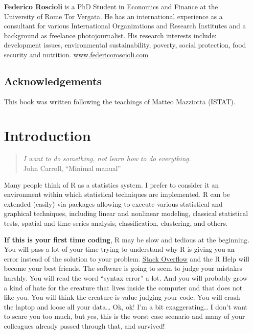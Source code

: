 \documentclass[
]{svmono}
\begin{document}
\textbf{Federico Roscioli} is a PhD Student in Economics and Finance at the University of Rome Tor Vergata. He has an international experience as a consultant for various International Organizations and Research Institutes and a background as freelance photojournalist. His research interests include: development issues, environmental sustainability, poverty, social protection, food security and nutrition.
\href{https://www.federicoroscioli.com/}{www.federicoroscioli.com}

\hypertarget{acknowledgements}{%
\section*{Acknowledgements}\label{acknowledgements}}

This book was written following the teachings of Matteo Mazziotta (ISTAT).

\newpage

\hypertarget{introduction}{%
\chapter*{Introduction}\label{introduction}}

\justifying

\begin{quote}
\emph{I want to do something, not learn how to do everything.}\\
John Carroll, ``Minimal manual''
\end{quote}

Many people think of R as a statistics system. I prefer to consider it
an environment within which statistical techniques are implemented. R
can be extended (easily) via packages allowing to execute various
statistical and graphical techniques, including linear and nonlinear
modeling, classical statistical tests, spatial and time-series analysis,
classification, clustering, and others.

\textbf{If this is your first time coding}, R may be slow and tedious at the
beginning. You will pass a lot of your time trying to understand why R
is giving you an error instead of the solution to your problem. \href{https://stackoverflow.com}{Stack
Overflow} and the R Help will become your
best friends. The software is going to seem to judge your mistakes
harshly. You will read the word ``syntax error'' a lot. And you will
probably grow a kind of hate for the creature that lives inside the
computer and that does not like you. You will think the creature is
value judging your code. You will crash the laptop and loose all your
data\ldots{} Ok, ok! I'm a bit exaggerating\ldots{} I don't want to scare you too
much, but yes, this is the worst case scenario and many of your
colleagues already passed through that, and survived!
\end{document}
